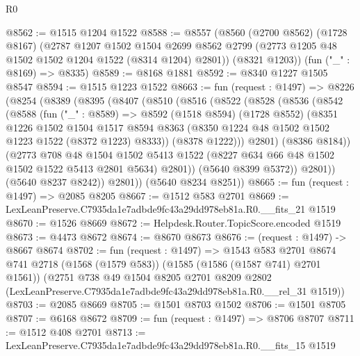 \begin{lexlean}{R0}
\begin{coremodule}
@8562 := @1515 @1204 @1522
@8588 := @8557
    (@8560
      (@2700 @8562)
      (@1728 @8167)
      (@2787
        @1207
        @1502
        @1504
        @2699
        @8562
        @2799
        (@2773 @1205 @48 @1502 @1502 @1204 @1522 (@8314 @1204) @2801))
      (@8321 @1203))
    (fun ("_" : @8169) => @8335)
@8589 := @8168 @1881
@8592 := @8340 @1227 @1505 @8547
@8594 := @1515 @1223 @1522
@8663 := fun (request : @1497) =>
  @8226
    (@8254
      (@8389
        (@8395
          (@8407
            (@8510
              (@8516
                (@8522
                  (@8528
                    (@8536
                      (@8542
                        (@8588
                          (fun ("_" : @8589) =>
                          @8592
                            (@1518 @8594)
                            (@1728 @8552)
                            (@8351
                              @1226
                              @1502
                              @1504
                              @1517
                              @8594
                              @8363
                              (@8350 @1224 @48 @1502 @1502 @1223 @1522 (@8372 @1223) @8333))
                            (@8378 @1222)))
                        @2801)
                      (@8386 @8184))
                    (@2773
                      @708
                      @48
                      @1504
                      @1502
                      @5413
                      @1522
                      (@8227 @634 @66 @48 @1502 @1502 @1522 @5413 @2801 @5634)
                      @2801))
                  (@5640 @8399 @5372))
                @2801))
            (@5640 @8237 @8242))
          @2801))
      (@5640 @8234 @8251))
@8665 := fun (request : @1497) => @2085 @8205
@8667 := @1512 @583 @2701
@8669 := LexLeanPreserve.C7935da1e7adbde9fc43a29dd978eb81a.R0.__fits_21 @1519
@8670 := @1526 @8669
@8672 := Helpdesk.Router.TopicScore.encoded @1519
@8673 := @4473 @8672
@8674 := @8670 @8673
@8676 := (request : @1497) -> @8667 @8674
@8702 := fun (request : @1497) =>
  @1543
    @583
    @2701
    @8674
    @741
    @2718
    (@1568 (@1579 @583))
    (@1585 (@1586 (@1587 @741) @2701 @1561))
    (@2751
      @738
      @49
      @1504
      @8205
      @2701
      @8209
      @2802
      (LexLeanPreserve.C7935da1e7adbde9fc43a29dd978eb81a.R0.__rel_31 @1519))
@8703 := @2085 @8669
@8705 := @1501 @8703 @1502
@8706 := @1501 @8705
@8707 := @6168 @8672
@8709 := fun (request : @1497) => @8706 @8707
@8711 := @1512 @408 @2701
@8713 := LexLeanPreserve.C7935da1e7adbde9fc43a29dd978eb81a.R0.__fits_15 @1519

\end{coremodule}
\end{lexlean}
